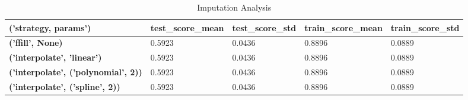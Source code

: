 \begin{table}
\caption{Imputation Analysis}
\label{tab:imputation_analysis}
\begin{tabular}{lllll}
\toprule
('strategy, params') & test\_score\_mean & test\_score\_std & train\_score\_mean & train\_score\_std \\
\midrule
\textbf{('ffill', None)} & 0.5923 & 0.0436 & 0.8896 & 0.0889 \\
\textbf{('interpolate', 'linear')} & 0.5923 & 0.0436 & 0.8896 & 0.0889 \\
\textbf{('interpolate', ('polynomial', 2))} & 0.5923 & 0.0436 & 0.8896 & 0.0889 \\
\textbf{('interpolate', ('spline', 2))} & 0.5923 & 0.0436 & 0.8896 & 0.0889 \\
\bottomrule
\end{tabular}
\end{table}